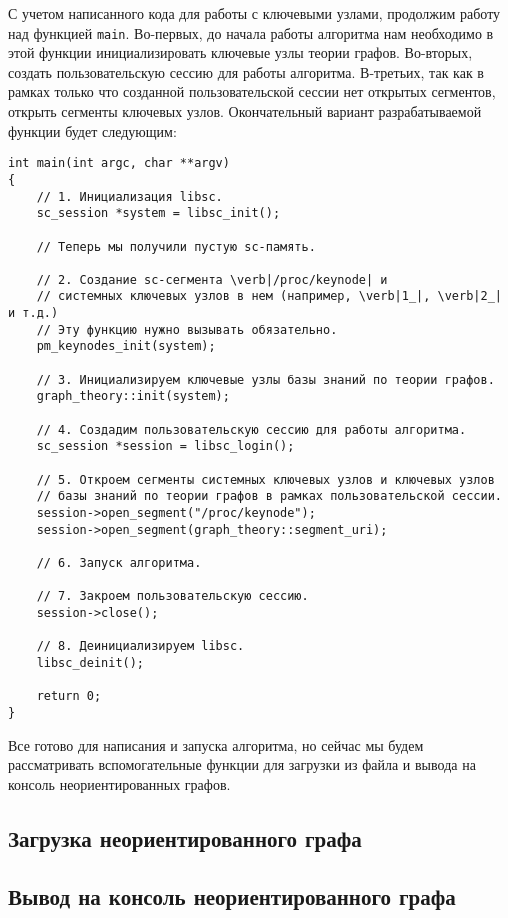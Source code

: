 С учетом написанного кода для работы с ключевыми узлами, продолжим
работу над функцией \lstinline|main|. Во-первых, до начала работы
алгоритма нам необходимо в этой функции инициализировать ключевые узлы
теории графов. Во-вторых, создать пользовательскую сессию для работы
алгоритма. В-третьих, так как в рамках только что созданной
пользовательской сессии нет открытых сегментов, открыть сегменты
ключевых узлов. Окончательный вариант разрабатываемой
функции будет следующим:
\begin{lstlisting}[texcl]
int main(int argc, char **argv)
{
    // 1. Инициализация libsc.
    sc_session *system = libsc_init();

    // Теперь мы получили пустую sc-память.

    // 2. Создание sc-сегмента \verb|/proc/keynode| и
    // системных ключевых узлов в нем (например, \verb|1_|, \verb|2_| и т.д.)
    // Эту функцию нужно вызывать обязательно.
    pm_keynodes_init(system);

    // 3. Инициализируем ключевые узлы базы знаний по теории графов.
    graph_theory::init(system);

    // 4. Создадим пользовательскую сессию для работы алгоритма.
    sc_session *session = libsc_login();

    // 5. Откроем сегменты системных ключевых узлов и ключевых узлов
    // базы знаний по теории графов в рамках пользовательской сессии.
    session->open_segment("/proc/keynode");
    session->open_segment(graph_theory::segment_uri);

    // 6. Запуск алгоритма.

    // 7. Закроем пользовательскую сессию.
    session->close();

    // 8. Деинициализируем libsc.
    libsc_deinit();

    return 0;
}
\end{lstlisting}

Все готово для написания и запуска алгоритма, но сейчас мы будем
рассматривать вспомогательные функции для загрузки из файла и вывода
на консоль неориентированных графов.

\subsection{Загрузка неориентированного графа}
\label{sec:libscprg_load_graph}

\subsection{Вывод на консоль неориентированного графа}
\label{sec:libscprg_print_graph}

